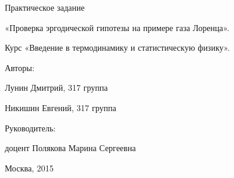 \documentclass[12pt,a4paper]{scrartcl}
\begin{document}


\begin{titlepage}
    \begin{center}
        \LARGE
        Практическое задание
  
        «Проверка эргодической гипотезы на примере газа Лоренца».
    \end{center}

    \par\bigskip
    
    \begin{center}
        \Large
        Курс «Введение в термодинамику и статистическую физику».
    \end{center}

	\begin{center}
		\Large
		Авторы: 
		
		Лунин Дмитрий, 317 группа
		
		Никишин Евгений, 317 группа
	\end{center}
	
	\begin{center}
		\Large
		Руководитель: 
		
		доцент Полякова Марина Сергеевна
	\end{center}

    \par\bigskip

    \tableofcontents
    
    \par\bigskip
    \par\bigskip
    \par\bigskip
    
    \par\bigskip
    \par\bigskip
    \par\bigskip
    \par\bigskip
    \par\bigskip
    \par\bigskip
    \par\bigskip
    \par\bigskip
    \par\bigskip
    \par\bigskip
    \par\bigskip
    \par\bigskip
    \par\bigskip
    
	\begin{center}
		\Large
		Москва, 2015
	\end{center}
\end{titlepage}
\end{document}
